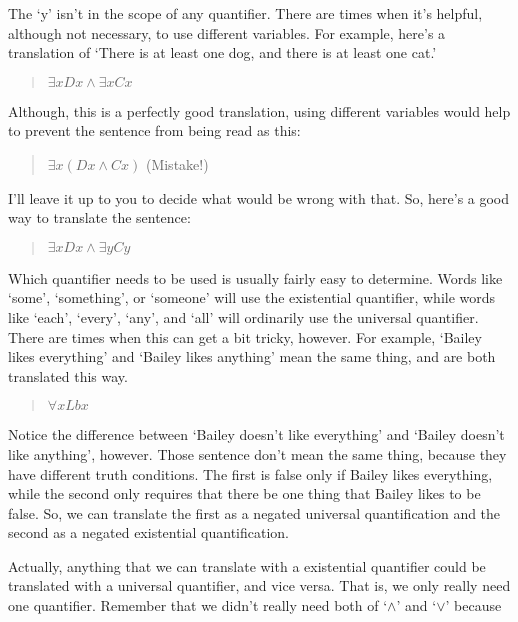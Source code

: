 \documentclass[../logic-text.tex]{subfiles}
\begin{document}
\noindent The \enquote*{y} isn't in the scope of any quantifier.
There are times when it's helpful, although not necessary, to use different variables.
For example, here's a translation of \enquote*{There is at least one dog, and there is at least one cat.}

\begin{quote}
  \(\exists xDx \land \exists xCx\)
\end{quote}

\noindent Although, this is a perfectly good translation, using different variables would help to prevent the sentence from being read as this:

\begin{quote}
   \(\exists x(Dx \land Cx)\) (Mistake!)
\end{quote}

\noindent I'll leave it up to you to decide what would be wrong with that. So, here's a good way to translate the sentence:

\begin{quote}
  \(\exists xDx \land \exists yCy\)
\end{quote}

Which quantifier needs to be used is usually fairly easy to determine.
Words like \enquote*{some}, \enquote*{something}, or \enquote*{someone} will use the existential quantifier, while words like \enquote*{each}, \enquote*{every}, \enquote*{any}, and \enquote*{all} will ordinarily use the universal quantifier.
There are times when this can get a bit tricky, however.
For example, \enquote*{Bailey likes everything} and \enquote*{Bailey likes anything} mean the same thing, and are both translated this way.


\begin{quote}
\(\forall xLbx\)
\end{quote}

Notice the difference between \enquote*{Bailey doesn't like everything} and \enquote*{Bailey doesn't like anything}, however.
Those sentence don't mean the same thing, because they have different truth conditions.
The first is false only if Bailey likes everything, while the second only requires that there be one thing that Bailey likes to be false.
So, we can translate the first as a negated universal quantification and the second as a negated existential quantification.

Actually, anything that we can translate with a existential quantifier could be translated with a universal quantifier, and vice versa.
That is, we only really need one quantifier.
Remember that we didn't really need both of \enquote*{\(\land\)} and \enquote*{\(\lor\)} because
\end{document}
